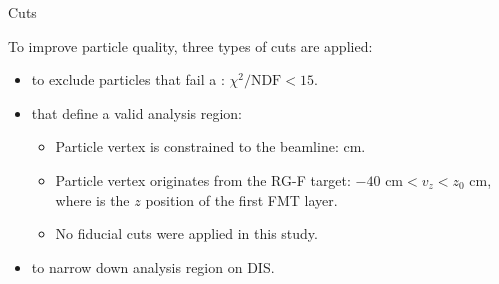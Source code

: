 \begin{frame}{Cuts}
    \label{11.21::summary}

    To improve particle quality, three types of cuts are applied:

    \vspace{12pt}

    \begin{itemize}
        \item
             to exclude particles that fail a : $\chi^2/\text{NDF} < 15$.

        \vspace{6pt}
        \item
             that define a valid analysis region:
            \begin{itemize}
                \vspace{6pt}
                \item
                    Particle vertex is constrained to the beamline:  \textcolor{efd_green}{cm}.

                \vspace{3pt}
                \item
                    Particle vertex originates from the RG-F target: \textcolor{efd_green}{$-40 \text{ cm} < v_z < z_0 \text{ cm}$}, where  is the $z$ position of the first FMT layer.

                \vspace{3pt}
                \item
                    No fiducial cuts were applied in this study.
            \end{itemize}

        \vspace{6pt}
        \item
             to narrow down analysis region on DIS.
    \end{itemize}
\end{frame}

